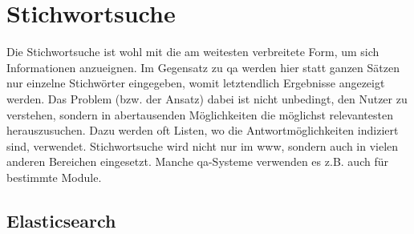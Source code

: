 \section{Stichwortsuche}

Die Stichwortsuche ist wohl mit die am weitesten verbreitete Form, um sich Informationen anzueignen.
Im Gegensatz zu \acl{qa} werden hier statt ganzen Sätzen nur einzelne Stichwörter eingegeben, womit letztendlich Ergebnisse angezeigt werden.
Das Problem (bzw. der Ansatz) dabei ist nicht unbedingt, den Nutzer zu verstehen, sondern in abertausenden Möglichkeiten die möglichst relevantesten herauszusuchen.
Dazu werden oft Listen, wo die Antwortmöglichkeiten indiziert sind, verwendet.
Stichwortsuche wird nicht nur im \ac{www}, sondern auch in vielen anderen Bereichen eingesetzt.
Manche \ac{qa}-Systeme verwenden es z.B. auch für bestimmte Module.

\subsection{Elasticsearch}

